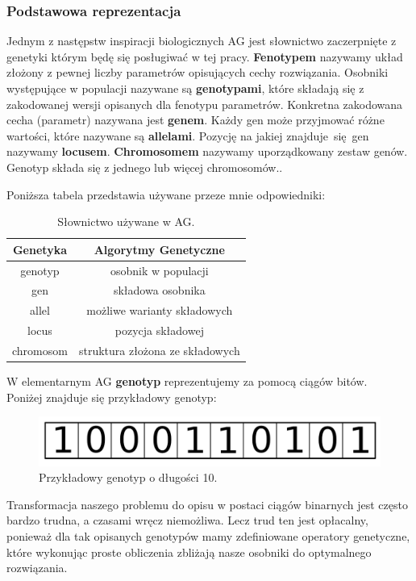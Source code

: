 \documentclass{article}
\begin{document}
\subsubsection{Podstawowa reprezentacja}
Jednym z następstw inspiracji biologicznych AG jest słownictwo zaczerpnięte 
z genetyki którym będę się posługiwać w tej pracy.
\textbf{Fenotypem} nazywamy  układ złożony z pewnej liczby parametrów opisujących cechy
rozwiązania. 
Osobniki występujące w populacji nazywane są \textbf{genotypami}, które 
składają się z zakodowanej wersji opisanych dla fenotypu parametrów. 
Konkretna zakodowana cecha (parametr) nazywana jest \textbf{genem}. Każdy gen może przyjmować 
różne wartości, które nazywane są \textbf{allelami}. Pozycję na jakiej znajduje się gen nazywamy
\textbf{locusem}. \textbf{Chromosomem} nazywamy uporządkowany zestaw genów.
Genotyp składa się z jednego lub więcej chromosomów.\cite{goldberg}.

Poniższa tabela przedstawia używane przeze mnie odpowiedniki:
\begin{table}[H]
\centering
\begin{tabular}{|c|c|}
	\hline
	Genetyka & Algorytmy Genetyczne\\
	\hline
	genotyp & osobnik w populacji\\
	gen & składowa osobnika\\
	allel & możliwe warianty składowych\\
	locus & pozycja składowej\\
	chromosom & struktura złożona ze składowych\\
	\hline
\end{tabular}
\caption{\label{tab:ag}Słownictwo używane w AG.}
\end{table}

W elementarnym AG \textbf{genotyp} reprezentujemy za pomocą ciągów bitów.\\
Poniżej znajduje się przykładowy genotyp:\\

\begin{figure}[H]
\centering
\includegraphics[scale=0.20]{genome_v2.png}
\caption{Przykładowy genotyp o długości 10.}
\end{figure}

Transformacja naszego problemu do opisu w postaci ciągów binarnych jest często bardzo trudna, a
czasami wręcz niemożliwa. Lecz trud ten jest opłacalny, ponieważ dla tak opisanych genotypów mamy
zdefiniowane operatory genetyczne, które wykonując proste obliczenia zbliżają nasze osobniki do
optymalnego rozwiązania.
\end{document}
